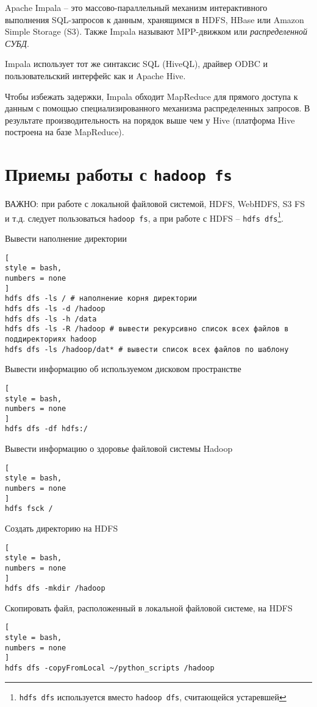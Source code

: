 \documentclass[%
	11pt,
	a4paper,
	utf8,
		]{article}
\begin{document}
Apache Impala -- это массово-параллельный механизм интерактивного выполнения SQL-запросов к данным, хранящимся в HDFS, HBase или Amazon Simple Storage (S3). Также Impala называют MPP-движком или \emph{распределенной СУБД}.

Impala использует тот же синтаксис SQL (HiveQL), драйвер ODBC и пользовательский интерфейс как и Apache Hive.

Чтобы избежать задержки, Impala обходит MapReduce для прямого доступа к данным с помощью специализированного механизма распределенных запросов. В результате производительность на порядок выше чем у Hive (платформа Hive построена на базе MapReduce).


\section{Приемы работы с \texttt{hadoop fs}}

ВАЖНО: при работе с локальной файловой системой, HDFS, WebHDFS, S3 FS и т.д. следует пользоваться \texttt{hadoop fs}, а при работе с HDFS -- \texttt{hdfs dfs}\footnote{\texttt{hdfs dfs} используется вместо \texttt{hadoop dfs}, считающейся устаревшей}.

Вывести наполнение директории
\begin{lstlisting}[
style = bash,
numbers = none	
]
hdfs dfs -ls / # наполнение корня директории
hdfs dfs -ls -d /hadoop
hdfs dfs -ls -h /data
hdfs dfs -ls -R /hadoop # вывести рекурсивно список всех файлов в поддиректориях hadoop
hdfs dfs -ls /hadoop/dat* # вывести список всех файлов по шаблону
\end{lstlisting}

Вывести информацию об используемом дисковом пространстве
\begin{lstlisting}[
style = bash,
numbers = none	
]
hdfs dfs -df hdfs:/
\end{lstlisting}

Вывести информацию о здоровье файловой системы Hadoop
\begin{lstlisting}[
style = bash,
numbers = none	
]
hdfs fsck /
\end{lstlisting}

Создать директорию на HDFS
\begin{lstlisting}[
style = bash,
numbers = none	
]
hdfs dfs -mkdir /hadoop
\end{lstlisting}

Скопировать файл, расположенный в локальной файловой системе, на HDFS
\begin{lstlisting}[
style = bash,
numbers = none	
]
hdfs dfs -copyFromLocal ~/python_scripts /hadoop
\end{lstlisting}
\end{document}
